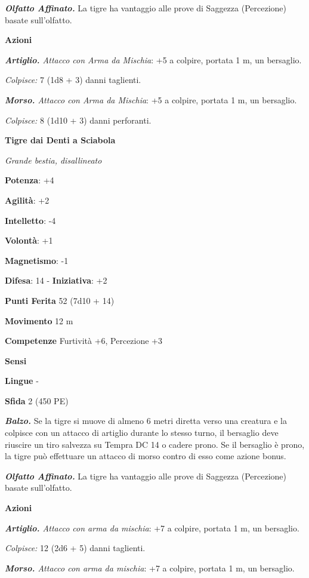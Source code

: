 \begin{multicols}{2}
\emph{\textbf{Olfatto Affinato.}} La tigre ha vantaggio alle prove di
Saggezza (Percezione) basate sull'olfatto.

\smallskip\textbf{Azioni}

\emph{\textbf{Artiglio.} Attacco con Arma da Mischia}: +5 a colpire,
portata 1 m, un bersaglio.

\emph{Colpisce:} 7 (1d8 + 3) danni taglienti.

\emph{\textbf{Morso.} Attacco con Arma da Mischia}: +5 a colpire,
portata 1 m, un bersaglio.

\emph{Colpisce:} 8 (1d10 + 3) danni perforanti.

\textbf{Tigre dai Denti a Sciabola}

\emph{Grande bestia, disallineato}

\textbf{Potenza}: +4

\textbf{Agilità}: +2

\textbf{Intelletto}: -4

\textbf{Volontà}: +1

\textbf{Magnetismo}: -1

\textbf{Difesa}: 14 - \textbf{Iniziativa}: +2

\textbf{Punti Ferita} 52 (7d10 + 14)

\textbf{Movimento} 12 m

\textbf{Competenze} Furtività +6, Percezione +3

\textbf{Sensi} 

\textbf{Lingue} -

\textbf{Sfida} 2 (450 PE)\smallskip

\emph{\textbf{Balzo.}} Se la tigre si muove di almeno 6 metri diretta
verso una creatura e la colpisce con un attacco di artiglio durante lo
stesso turno, il bersaglio deve riuscire un tiro salvezza su Tempra DC 14
o cadere prono. Se il bersaglio è prono, la tigre può effettuare un
attacco di morso contro di esso come azione bonus.

\emph{\textbf{Olfatto Affinato.}} La tigre ha vantaggio alle prove di
Saggezza (Percezione) basate sull'olfatto.

\smallskip\textbf{Azioni}

\emph{\textbf{Artiglio.} Attacco con arma da mischia}: +7 a colpire,
portata 1 m, un bersaglio.

\emph{Colpisce:} 12 (2d6 + 5) danni taglienti.

\emph{\textbf{Morso.} Attacco con arma da mischia}: +7 a colpire,
portata 1 m, un bersaglio.


\end{multicols}
